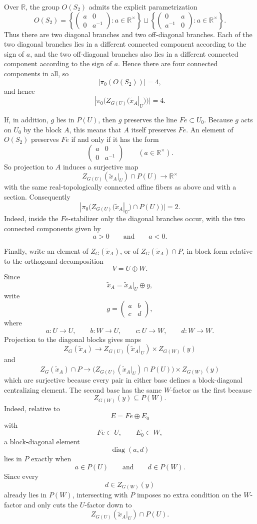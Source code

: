 \documentclass[
  11pt,
]{article}
\begin{document}
Over \(\mathbb R\), the group \(O(S_2)\) admits the explicit
parametrization \[
O(S_2)=
\left\{
\begin{pmatrix}
a&0\\
0&a^{-1}
\end{pmatrix}:a\in \mathbb R^\times
\right\}
\sqcup
\left\{
\begin{pmatrix}
0&a\\
a^{-1}&0
\end{pmatrix}:a\in \mathbb R^\times
\right\}.
\] Thus there are two diagonal branches and two off-diagonal branches.
Each of the two diagonal branches lies in a different connected
component according to the sign of \(a\), and the two off-diagonal
branches also lies in a different connected component according to the
sign of \(a\). Hence there are four connected components in all, so \[
|\pi_0(O(S_2))|=4,
\] and hence \[
|\pi_0(Z_{G(U)}(\widetilde x_A|_U))|=4.
\]

If, in addition, \(g\) lies in \(P(U)\), then \(g\) preserves the line
\(Fe\subset U_0\). Because \(g\) acts on \(U_0\) by the block \(A\),
this means that \(A\) itself preserves \(Fe\). An element of \(O(S_2)\)
preserves \(Fe\) if and only if it has the form \[
\begin{pmatrix}
a&0\\
0&a^{-1}
\end{pmatrix}
\qquad (a\in \mathbb R^\times).
\] So projection to \(A\) induces a surjective map \[
Z_{G(U)}(\widetilde x_A|_U)\cap P(U)\to \mathbb R^\times
\] with the same real-topologically connected affine fibers as above and
with a section. Consequently \[
|\pi_0\bigl(Z_{G(U)}(\widetilde x_A|_U)\cap P(U)\bigr)|=2.
\] Indeed, inside the \(Fe\)-stabilizer only the diagonal branches
occur, with the two connected components given by \[
a>0
\qquad\text{and}\qquad
a<0.
\]

Finally, write an element of \(Z_G(\widetilde x_A)\), or of
\(Z_G(\widetilde x_A)\cap P\), in block form relative to the orthogonal
decomposition \[
V=U\oplus W.
\] Since \[
\widetilde x_A=\widetilde x_A|_U\oplus y,
\] write \[
g=
\begin{pmatrix}
a&b\\
c&d
\end{pmatrix},
\] where \[
a:U\to U,\qquad b:W\to U,\qquad c:U\to W,\qquad d:W\to W.
\] Projection to the diagonal blocks gives maps \[
Z_G(\widetilde x_A)\to Z_{G(U)}(\widetilde x_A|_U)\times Z_{G(W)}(y)
\] and \[
Z_G(\widetilde x_A)\cap P
\to
\bigl(Z_{G(U)}(\widetilde x_A|_U)\cap P(U)\bigr)\times Z_{G(W)}(y)
\] which are surjective because every pair in either base defines a
block-diagonal centralizing element. The second base has the same
\(W\)-factor as the first because \[
Z_{G(W)}(y)\subseteq P(W).
\] Indeed, relative to \[
E=Fe\oplus E_0
\] with \[
Fe\subset U,
\qquad
E_0\subset W,
\] a block-diagonal element \[
\operatorname{diag}(a,d)
\] lies in \(P\) exactly when \[
a\in P(U)
\qquad\text{and}\qquad
d\in P(W).
\] Since every \[
d\in Z_{G(W)}(y)
\] already lies in \(P(W)\), intersecting with \(P\) imposes no extra
condition on the \(W\)-factor and only cuts the \(U\)-factor down to \[
Z_{G(U)}(\widetilde x_A|_U)\cap P(U).
\]
\end{document}
